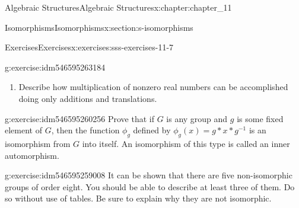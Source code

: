 \documentclass[oneside,10pt,]{book}
\numberwithin{equation}{section}
\begin{document}
\begin{chapterptx}{Algebraic Structures}{}{Algebraic Structures}{}{}{x:chapter:chapter_11}
\begin{sectionptx}{Isomorphisms}{}{Isomorphisms}{}{}{x:section:s-isomorphisms}
\begin{exercises-subsection}{Exercises}{}{Exercises}{}{}{x:exercises:sss-exercises-11-7}
\begin{divisionexercise}{8}{}{}{g:exercise:idm546595263184}
\begin{enumerate}[label=(\alph*)]
\item{}Describe how multiplication of nonzero real numbers can be accomplished doing only additions and translations.%
\end{enumerate}
%
\end{divisionexercise}%
\begin{divisionexercise}{9}{}{}{g:exercise:idm546595260256}%
Prove that if \(G\) is any group and \(g\) is some fixed element of \(G\), then the function \(\phi _g\) defined by \(\phi_g(x) = g*x*g^{-1}\) is an isomorphism from \(G\) into itself.  An isomorphism of this type is called an inner automorphism.%
\end{divisionexercise}%
\begin{divisionexercise}{10}{}{}{g:exercise:idm546595259008}%
It can be shown that there are five non-isomorphic groups of order eight. You should be able to describe at least three of them. Do so without use of tables. Be sure to explain why they are not isomorphic.%
\end{divisionexercise}%
\end{exercises-subsection}
\end{sectionptx}
\end{chapterptx}
%
%
\typeout{************************************************}
\typeout{************************************************}
%
\end{document}
